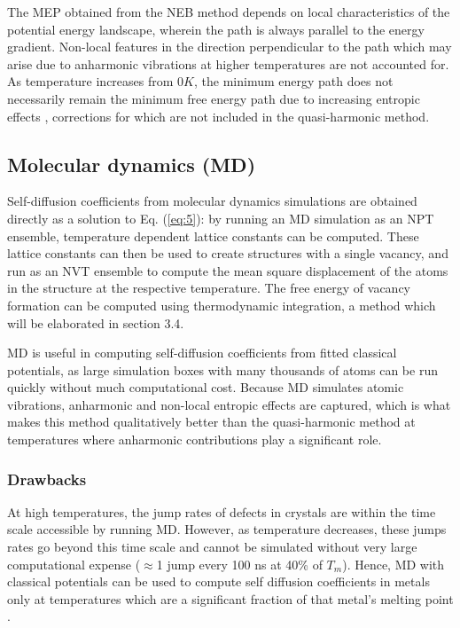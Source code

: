 \documentclass{article}
\begin{document}
The MEP obtained from the NEB method depends on local characteristics of the potential energy landscape, wherein the path is always parallel to the energy gradient. Non-local features in the direction perpendicular to the path which may arise due to anharmonic vibrations at higher temperatures are not accounted for. As temperature increases from $0K$, the minimum energy path does not necessarily remain the minimum free energy path due to increasing entropic effects \cite{Vanden-Eijnden2009}, corrections for which are not included in the quasi-harmonic method.

\subsection{Molecular dynamics (MD)}

Self-diffusion coefficients from molecular dynamics simulations are obtained directly as a solution to Eq. (\ref{eq:5}): by running an MD simulation as an NPT ensemble, temperature dependent lattice constants can be computed. These lattice constants can then be used to create structures with a single vacancy, and run as an NVT ensemble to compute the mean square displacement of the atoms in the structure at the respective temperature. The free energy of vacancy formation can be computed using thermodynamic integration, a method which will be elaborated in section 3.4.

MD is useful in computing self-diffusion coefficients from fitted classical potentials, as large simulation boxes with many thousands of atoms can be run quickly without much computational cost. Because MD simulates atomic vibrations, anharmonic and non-local entropic effects are captured, which is what makes this method qualitatively better than the quasi-harmonic method at temperatures where anharmonic contributions play a significant role.

\subsubsection{Drawbacks}

\noindent At high temperatures, the jump rates of defects in crystals are within the time scale accessible by running MD. However, as temperature decreases, these jumps rates go beyond this time scale and cannot be simulated without very large computational expense ($\approx$1 jump every 100 ns at 40\% of $T_m$). Hence, MD with classical potentials can be used to compute self diffusion coefficients in metals only at temperatures which are a significant fraction of that metal's melting point \cite{Mendelev2009}. 
\end{document}
